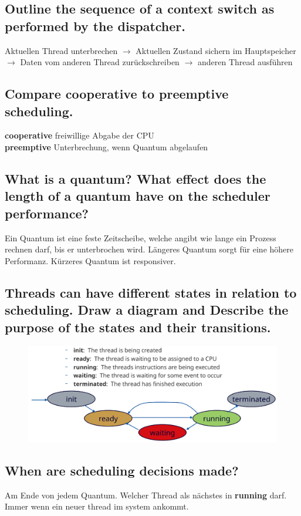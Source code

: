 \subsection{Outline the sequence of a context switch as performed by the dispatcher.}
Aktuellen Thread unterbrechen $\rightarrow$ Aktuellen Zustand sichern im Hauptspeicher $\rightarrow$ Daten vom anderen Thread zur\"uckschreiben $\rightarrow$ anderen Thread ausf\"uhren

\subsection{Compare cooperative to preemptive scheduling.}
\textbf{cooperative} freiwillige Abgabe der CPU\\
\textbf{preemptive} Unterbrechung, wenn Quantum abgelaufen

\subsection{What is a quantum? What effect does the length of a quantum have on the scheduler performance?}
Ein Quantum ist eine feste Zeitscheibe, welche angibt wie lange ein Prozess rechnen darf, bis er unterbrochen wird. L\"angeres Quantum sorgt f\"ur eine h\"ohere Performanz. K\"urzeres Quantum ist responsiver.

\subsection{Threads can have different states in relation to scheduling. Draw a diagram and Describe the purpose of the states and their transitions.}

\begin{figure}[H]
	\centering
	\includegraphics[width=0.7\linewidth]{Pictures/scheduling_dia}
\end{figure}

\subsection{When are scheduling decisions made?}
Am Ende von jedem Quantum. Welcher Thread als n\"achstes in \textbf{running} darf. Immer wenn ein neuer thread im system ankommt.

